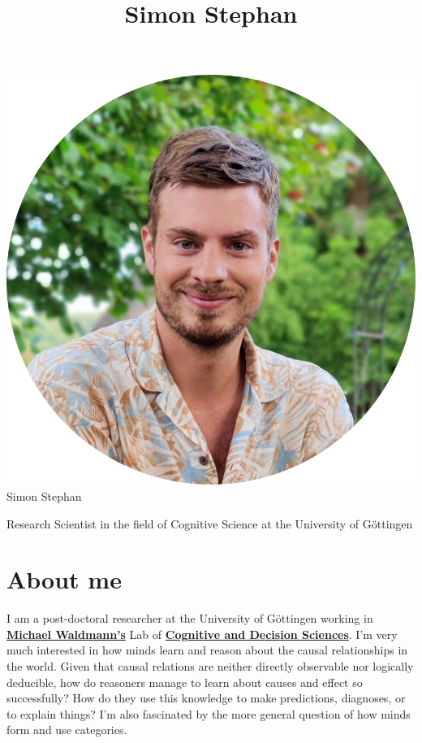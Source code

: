 \documentclass[
]{article}
\title{Simon Stephan}
\author{}
\date{\vspace{-2.5em}}
\begin{document}
\maketitle

\includegraphics{images/home/avatar.png}\\

Simon Stephan

Research Scientist in the field of Cognitive Science at the University
of Göttingen

\href{mailto:simon.stephan@psych.uni-goettingen.de}{}
\href{https://github.com/SimonStephan31}{}
\href{https://twitter.com/SimonStephan31}{}
\href{https://scholar.google.de/citations?hl=de\&user=_GsFvvAAAAAJ}{}

\hypertarget{about-me}{%
\section{About me}\label{about-me}}

I am a post-doctoral researcher at the University of Göttingen working
in
\textbf{\href{https://www.psych.uni-goettingen.de/de/cognition/team/waldmann}{Michael
Waldmann's}} Lab of
\textbf{\href{https://www.psych.uni-goettingen.de/en/cognition?set_language=en}{Cognitive
and Decision Sciences}}. I'm very much interested in how minds learn and
reason about the causal relationships in the world. Given that causal
relations are neither directly observable nor logically deducible, how
do reasoners manage to learn about causes and effect so successfully?
How do they use this knowledge to make predictions, diagnoses, or to
explain things? I'm also fascinated by the more general question of how
minds form and use categories.
\end{document}
